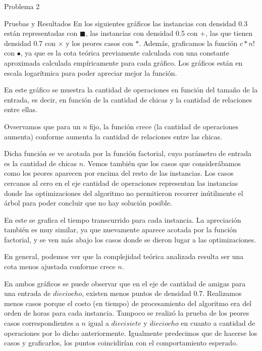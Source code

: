 \begin{section}{Problema 2}
\begin{subsection}{Pruebas y Resultados}
		En los siguientes gráficos las instancias con densidad 0.3 están representadas con {\color{cyan}$\blacksquare$}, las instancias con densidad 0.5 con {\color{red}+}, las que tienen densidad 0.7 con {\color{green}$\times$} y los peores casos con {\color{blue}$\ast$}. Además, graficamos la función $c*n!$ con $\bullet$, ya que es la cota teórica previamente calculada con una constante aproximada calculada empíricamente para cada gráfico.
		Los gráficos están en escala logarítmica para poder apreciar mejor la función.\VSP
		
		\newpage

		\VSP

		En este gráfico se muestra la cantidad de operaciones en función del tamaño de la entrada, es decir, en función de la cantidad de chicas y la cantidad de relaciones entre ellas.

		Ovservamos que para un $n$ fijo, la función crece (la cantidad de operaciones aumenta) conforme aumenta la cantidad de relaciones entre las chicas.

		Dicha función se ve acotada por la función factorial, cuyo parámetro de entrada es la cantidad de chicas $n$. Vemos también que los casos que considerábamos como los peores aparecen por encima del resto de las instancias. Los casos cercanos al cero en el eje cantidad de operaciones representan las instancias donde las optimizaciones del algoritmo no permitieron recorrer inútilmente el árbol para poder concluir que no hay solución posible.\VSP

		\newpage

		\VSP

		En este se grafica el tiempo transcurrido para cada instancia. La apreciación también es muy similar, ya que nuevamente aparece acotada por la función factorial, y se ven más abajo los casos donde se dieron lugar a las optimizaciones.

		En general, podemos ver que la complejidad teórica analizada resulta ser una cota menos ajustada conforme crece $n$.
		
		En ambos gráficos se puede observar que en el eje de cantidad de amigas para una entrada de $dieciocho$, existen menos puntos de densidad $0.7$. Realizamos menos casos porque el costo (en tiempo) de procesamiento del algoritmo era del orden de horas para cada instancia. Tampoco se realizó la prueba de los peores casos correspondientes a $n$ igual a $diecisiete$ y $dieciocho$ en cuanto a cantidad de operaciones por lo dicho anteriormente. Igualmente predecimos que de hacerse los casos y graficarlos, los puntos coincidirían con el comportamiento esperado.


\end{subsection}
\end{section}

